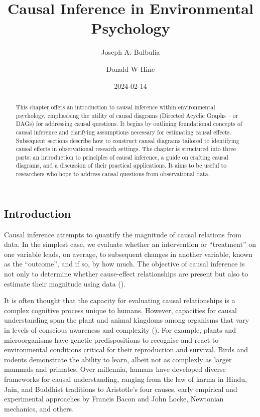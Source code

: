 \documentclass[
  singlecolumn]{article}
\title{Causal Inference in Environmental Psychology}
\author{Joseph A. Bulbulia \and Donald W Hine}
\date{2024-02-14}
\begin{document}
\maketitle
\begin{abstract}
This chapter offers an introduction to causal inference within
environmental psychology, emphasising the utility of causal diagrams
(Directed Acyclic Graphs -- or DAGs) for addressing causal questions. It
begins by outlining foundational concepts of causal inference and
clarifying assumptions necessary for estimating causal effects.
Subsequent sections describe how to construct causal diagrams tailored
to identifying causal effects in observational research settings. The
chapter is structured into three parts: an introduction to principles of
causal inference, a guide on crafting causal diagrams, and a discussion
of their practical applications. It aims to be useful to researchers who
hope to address causal questions from observational data.
\end{abstract}

\subsection{Introduction}\label{introduction}

Causal inference attempts to quantify the magnitude of causal relations
from data. In the simplest case, we evaluate whether an intervention or
``treatment'' on one variable leads, on average, to subsequent changes
in another variable, known as the ``outcome'', and if so, by how much.
The objective of causal inference is not only to determine whether
cause-effect relationships are present but also to estimate their
magnitude using data ().

It is often thought that the capacity for evaluating causal
relationships is a complex cognitive process unique to humans. However,
capacities for causal understanding span the plant and animal kingdoms
among organisms that vary in levels of conscious awareness and
complexity (). For
example, plants and microorganisms have genetic predispositions to
recognise and react to environmental conditions critical for their
reproduction and survival. Birds and rodents demonstrate the ability to
learn, albeit not as complexly as larger mammals and primates. Over
millennia, humans have developed diverse frameworks for causal
understanding, ranging from the law of karma in Hindu, Jain, and
Buddhist traditions to Aristotle's four causes, early empirical and
experimental approaches by Francis Bacon and John Locke, Newtonian
mechanics, and others.
\end{document}
